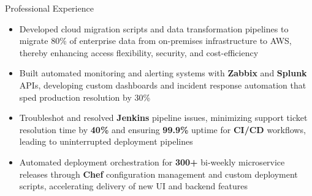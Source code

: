 \documentclass{resume}
\begin{document}
\begin{experienceSection}{Professional Experience}
    \experienceItem[
        company={Cerner Healthcare},
        location={Bangalore, KA},
        position={Software Engineer - Systems},
        duration={May 2021 - Jul 2023}
    ]
    \begin{itemize}
        \itemsep -6pt {}
        \item Developed cloud migration scripts and data transformation pipelines to migrate 80\% of enterprise data from on-premises infrastructure to AWS, thereby enhancing access flexibility, security, and cost-efficiency
        \item Built automated monitoring and alerting systems with \textbf{Zabbix} and \textbf{Splunk} APIs, developing custom dashboards and incident response automation that sped production resolution by 30\%
        \item Troubleshot and resolved \textbf{Jenkins} pipeline issues, minimizing support ticket resolution time by \textbf{40\%} and ensuring \textbf{99.9\%} uptime for \textbf{CI/CD} workflows, leading to uninterrupted deployment pipelines
        \item Automated deployment orchestration for \textbf{300+} bi-weekly microservice releases through \textbf{Chef} configuration management and custom deployment scripts, accelerating delivery of new UI and backend features
    \end{itemize}

\end{experienceSection}
\end{document}
